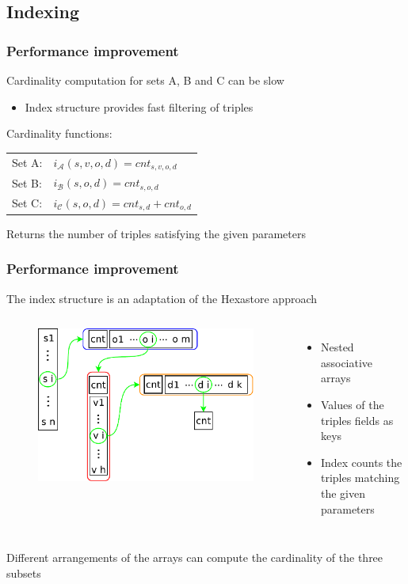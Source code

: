 \documentclass{beamer}
\begin{document}
\subsection{Indexing}

\begin{frame}
\frametitle{Performance improvement}
Cardinality computation for sets A, B and C can be slow
\begin{itemize}
\item Index structure provides fast filtering of triples
\end{itemize}
\bigskip
Cardinality functions:\\
\begin{center}
\begin{tabular}{ll}
Set A: & $i_{\mathcal{A}} (s,v,o,d) = cnt_{s,v,o,d}$\\
Set B: & $i_{\mathcal{B}} (s,o,d) = cnt_{s,o,d}$\\
Set C: & $i_{\mathcal{C}} (s,o,d) = cnt_{s,d} + cnt_{o,d}$\\
\end{tabular}
\end{center}
\bigskip
Returns the number of triples satisfying the given parameters
\end{frame}


\begin{frame}
\frametitle{Performance improvement}
The index structure is an adaptation of the Hexastore approach
\begin{columns}
\begin{figure}
\includegraphics[scale=0.35]{imgs/index}
\end{figure}
\begin{itemize}
\item Nested associative arrays
\item Values of the triples fields as keys
\item Index counts the triples matching the given parameters
\end{itemize}
\end{columns}
\bigskip
Different arrangements of the arrays can compute the cardinality of the
three subsets
\end{frame}
\end{document}

